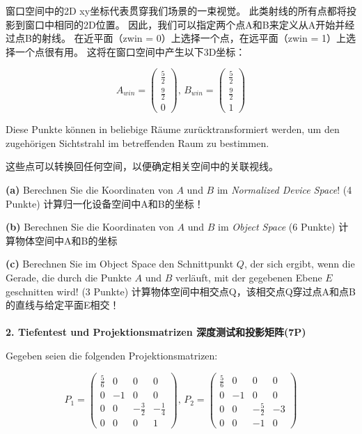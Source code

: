 \documentclass[fleqn]{article}
\begin{document}
 窗口空间中的2D xy坐标代表贯穿我们场景的一束视觉。 此类射线的所有点都将投影到窗口中相同的2D位置。 因此，我们可以指定两个点A和B来定义从A开始并经过点B的射线。 在近平面（zwin = 0）上选择一个点，在远平面（zwin = 1）上选择一个点很有用。 这将在窗口空间中产生以下3D坐标：

$$A_{win}=\begin{pmatrix}
    \frac{5}{2}\\\frac{9}{2}\\0
\end{pmatrix},\,B_{win}=\begin{pmatrix}
    \frac{5}{2}\\\frac{9}{2}\\1
\end{pmatrix}$$

Diese Punkte können in beliebige Räume zurücktransformiert werden, um den zugehörigen Sichtstrahl im betreffenden Raum zu bestimmen.

这些点可以转换回任何空间，以便确定相关空间中的关联视线。

\indent\textbf{(a)} Berechnen Sie die Koordinaten von $A$ und $B$ im \textit{Normalized Device Space}! (4 Punkte)
计算归一化设备空间中A和B的坐标！

\indent\textbf{(b)} Berechnen Sie die Koordinaten von $A$ und $B$ im \textit{Object Space} (6 Punkte)
计算物体空间中A和B的坐标

\indent\textbf{(c)} Berechnen Sie im Object Space den Schnittpunkt $Q$, der sich ergibt, wenn die Gerade, die durch die Punkte $A$ und $B$ verläuft, mit der gegebenen Ebene $E$ geschnitten wird! (3 Punkte)
计算物体空间中相交点Q，该相交点Q穿过点A和点B的直线与给定平面E相交！
\\
\\
\noindent\textbf{2. Tiefentest und Projektionsmatrizen 深度测试和投影矩阵(7P)}

Gegeben seien die folgenden Projektionsmatrizen:

$$P_1=\begin{pmatrix}
    \frac{5}{6}&0&0&0\\
    0&-1&0&0\\
    0&0&-\frac{3}{2}&-\frac{1}{4}\\
    0&0&0&1
\end{pmatrix},\,P_2=\begin{pmatrix}
    \frac{5}{6}&0&0&0\\
    0&-1&0&0\\
    0&0&-\frac{5}{2}&-3\\
    0&0&-1&0
\end{pmatrix}$$
\end{document}
